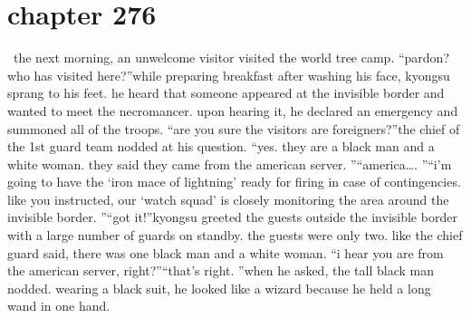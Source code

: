 \section{chapter 276}






 the next morning, an unwelcome visitor visited the world tree camp.
“pardon? who has visited here?”while preparing breakfast after washing his face, kyongsu sprang to his feet.
he heard that someone appeared at the invisible border and wanted to meet the necromancer.
upon hearing it, he declared an emergency and summoned all of the troops.
“are you sure the visitors are foreigners?”the chief of the 1st guard team nodded at his question.
“yes.
 they are a black man and a white woman.
 they said they came from the american server.
”“america….
”“i’m going to have the ‘iron mace of lightning’ ready for firing in case of contingencies.
 like you instructed, our ‘watch squad’ is closely monitoring the area around the invisible border.
”“got it!”kyongsu greeted the guests outside the invisible border with a large number of guards on standby.
 the guests were only two.
 like the chief guard said, there was one black man and a white woman.
“i hear you are from the american server, right?”“that’s right.
”when he asked, the tall black man nodded.
 wearing a black suit, he looked like a wizard because he held a long wand in one hand.

